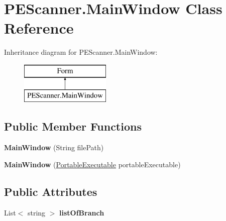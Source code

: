 \hypertarget{class_p_e_scanner_1_1_main_window}{}\section{P\+E\+Scanner.\+Main\+Window Class Reference}
\label{class_p_e_scanner_1_1_main_window}
Inheritance diagram for P\+E\+Scanner.\+Main\+Window\+:\begin{figure}[H]
\begin{center}
\leavevmode
\includegraphics[height=2.000000cm]{class_p_e_scanner_1_1_main_window}
\end{center}
\end{figure}
\subsection*{Public Member Functions}
\begin{DoxyCompactItemize}
\item 
\mbox{\label{class_p_e_scanner_1_1_main_window_a1008845c06974fcef59ed792b2cf2532}} 
{\bfseries Main\+Window} (String file\+Path)
\item 
\mbox{\label{class_p_e_scanner_1_1_main_window_a2a61549f3aa9dbf1ad31c1a7f0ee7f25}} 
{\bfseries Main\+Window} (\mbox{\hyperlink{class_p_e_d_scanner_lib_1_1_core_1_1_portable_executable}{Portable\+Executable}} portable\+Executable)
\end{DoxyCompactItemize}
\subsection*{Public Attributes}
\begin{DoxyCompactItemize}
\item 
\mbox{\label{class_p_e_scanner_1_1_main_window_a8ee987dc041e039082488af2717b45fc}} 
List$<$ string $>$ {\bfseries list\+Of\+Branch}
\end{DoxyCompactItemize}
